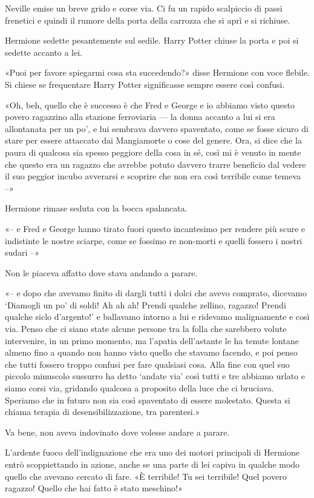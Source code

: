 Neville emise un breve grido e corse via. Ci fu un rapido scalpiccio di passi frenetici e quindi il rumore della porta della carrozza che si aprì e si richiuse.

Hermione sedette pesantemente sul sedile. Harry Potter chiuse la porta e poi si sedette accanto a lei.

«Puoi per favore spiegarmi cosa sta succedendo?» disse Hermione con voce flebile. Si chiese se frequentare Harry Potter significasse sempre essere così confusi.

«Oh, beh, quello che è successo è che Fred e George e io abbiamo visto questo povero ragazzino alla stazione ferroviaria — la donna accanto a lui si era allontanata per un po’, e lui sembrava davvero spaventato, come se fosse sicuro di stare per essere attaccato dai Mangiamorte o cose del genere. Ora, si dice che la paura di qualcosa sia spesso peggiore della cosa in sé, così mi è venuto in mente che questo era un ragazzo che avrebbe potuto davvero trarre beneficio dal vedere il suo peggior incubo avverarsi e scoprire che non era così terribile come temeva –»

Hermione rimase seduta con la bocca spalancata.

«– e Fred e George hanno tirato fuori questo incantesimo per rendere più scure e indistinte le nostre sciarpe, come se fossimo re non-morti e quelli fossero i nostri sudari –»

Non le piaceva affatto dove stava andando a parare.

«– e dopo che avevamo finito di dargli tutti i dolci che avevo comprato, dicevamo ‘Diamogli un po’ di soldi! Ah ah ah! Prendi qualche zellino, ragazzo! Prendi qualche siclo d’argento!’ e ballavamo intorno a lui e ridevamo malignamente e così via. Penso che ci siano state alcune persone tra la folla che sarebbero volute intervenire, in un primo momento, ma l’apatia dell’astante le ha tenute lontane almeno fino a quando non hanno visto quello che stavamo facendo, e poi penso che tutti fossero troppo confusi per fare qualsiasi cosa. Alla fine con quel suo piccolo minuscolo sussurro ha detto ‘andate via’ così tutti e tre abbiamo urlato e siamo corsi via, gridando qualcosa a proposito della luce che ci bruciava. Speriamo che in futuro non sia così spaventato di essere molestato. Questa si chiama terapia di desensibilizzazione, tra parentesi.»

Va bene, non aveva indovinato dove volesse andare a parare.

L’ardente fuoco dell’indignazione che era uno dei motori principali di Hermione entrò scoppiettando in azione, anche se una parte di lei capiva in qualche modo quello che avevano cercato di fare. «È terribile! Tu sei terribile! Quel povero ragazzo! Quello che hai fatto è stato meschino!»

